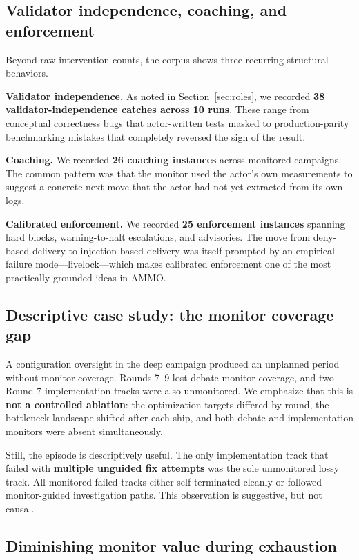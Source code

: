 \documentclass[11pt]{article}
\begin{document}
\subsection{Validator independence, coaching, and enforcement}

Beyond raw intervention counts, the corpus shows three recurring structural behaviors.

\textbf{Validator independence.}
As noted in Section~\ref{sec:roles}, we recorded \textbf{38 validator-independence catches across 10 runs}. These range from conceptual correctness bugs that actor-written tests masked to production-parity benchmarking mistakes that completely reversed the sign of the result.

\textbf{Coaching.}
We recorded \textbf{26 coaching instances} across monitored campaigns. The common pattern was that the monitor used the actor's own measurements to suggest a concrete next move that the actor had not yet extracted from its own logs.

\textbf{Calibrated enforcement.}
We recorded \textbf{25 enforcement instances} spanning hard blocks, warning-to-halt escalations, and advisories. The move from deny-based delivery to injection-based delivery was itself prompted by an empirical failure mode---livelock---which makes calibrated enforcement one of the most practically grounded ideas in AMMO.

\subsection{Descriptive case study: the monitor coverage gap}

A configuration oversight in the deep campaign produced an unplanned period without monitor coverage. Rounds 7--9 lost debate monitor coverage, and two Round 7 implementation tracks were also unmonitored. We emphasize that this is \textbf{not a controlled ablation}: the optimization targets differed by round, the bottleneck landscape shifted after each ship, and both debate and implementation monitors were absent simultaneously.

Still, the episode is descriptively useful. The only implementation track that failed with \textbf{multiple unguided fix attempts} was the sole unmonitored lossy track. All monitored failed tracks either self-terminated cleanly or followed monitor-guided investigation paths. This observation is suggestive, but not causal.

\subsection{Diminishing monitor value during exhaustion}
\end{document}
